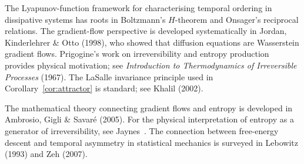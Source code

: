 \begin{CitationAnchor}
  The Lyapunov-function framework for characterising temporal
  ordering in dissipative systems has roots in Boltzmann's
  $H$-theorem and Onsager's reciprocal relations.
  The gradient-flow perspective is developed systematically in
  Jordan, Kinderlehrer \& Otto (1998), who showed that diffusion
  equations are Wasserstein gradient flows.
  Prigogine's work on irreversibility and entropy production
  provides physical motivation; see \textit{Introduction to
  Thermodynamics of Irreversible Processes} (1967).
  The LaSalle invariance principle used in
  Corollary~\ref{cor:attractor} is standard; see Khalil (2002).
\end{CitationAnchor}

\begin{FurtherReading}
  The mathematical theory connecting gradient flows and entropy
  is developed in Ambrosio, Gigli \& Savaré (2005).
  For the physical interpretation of entropy as a generator
  of irreversibility, see Jaynes~\cite{jaynes2003}.
  The connection between free-energy descent and temporal
  asymmetry in statistical mechanics is surveyed in
  Lebowitz (1993) and Zeh (2007).
\end{FurtherReading}
